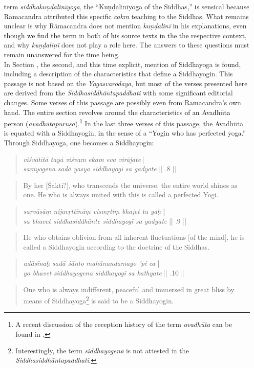 term \textit{siddhakuṇḍalinīyoga}, the ``Kuṇḍalinīyoga of the Siddhas,'' is sensical because Rāmacandra attributed this specific \textit{cakra} teaching to the Siddhas. What remains unclear is why Rāmacandra does not mention \textit{kuṇḍalinī} in his explanations, even though we find the term in both of his source texts in the the respective context, and why \textit{kuṇḍaliṇī} does not play a role here. The answers to these questions must remain unanswered for the time being.\\  

In Section , the second, and this time explicit, mention of Siddhayoga is found, including a description of the characteristics that define a Siddhayogin. This passage is not based on the \textit{Yogasvarodaya}, but most of the verses presented here are derived from the \textit{Siddhasiddhāntapaddhati} with some significant editorial changes. Some verses of this passage are possibly even from Rāmacandra's own hand. The entire section revolves around the characteristics of an Avadhūta person (\textit{avadhūtapuruṣa}).\footnote{A recent discussion of the reception history of the term \textit{avadhūta} can be found in \cite{pudi2023}.} In the last three verses of this passage, the Avadhūta is equated with a Siddhayogin, in the sense of a ``Yogin who has perfected yoga.'' Through Siddhayoga, one becomes a Siddhayogin:

\begin{quote}
  \textit{viśvātītā tayā viśvam ekam eva virājate} |\\
  \textit{saṃyogena sadā yasya siddhayogī sa gadyate} || .8 ||
\end{quote}
\begin{quote}
  By her [Śakti?], who transcends the universe, the entire world shines as one. He who is always united with this is called a perfected Yogi. 
\end{quote}
\begin{quote}
  \textit{sarvāsāṃ nijavṛttīnāṃ vismṛtiṃ bhajet tu yaḥ} |\\
  \textit{sa bhavet siddhasiddhānte siddhayogī sa gadyate} || .9 ||
\end{quote}
\begin{quote}
  He who obtains oblivion from all inherent fluctuations [of the mind], he is called a Siddhayogin according to the doctrine of the Siddhas.
\end{quote}
  \begin{quote}
  \textit{udāsīnaḥ sadā śānto mahānandamayo 'pi ca} |\\
  \textit{yo bhavet siddhayogena siddhayogī sa kathyate} || .10 ||
\end{quote}
\begin{quote}
One who is always indifferent, peaceful and immersed in great bliss by means of Siddhayoga\footnote{Interestingly, the term \textit{siddhayogena} is not attested in the \textit{Siddhasiddhāntapaddhati}.} is said to be a Siddhayogin.
\end{quote}

